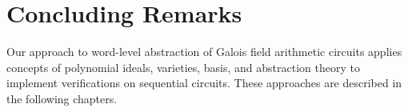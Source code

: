 \section{Concluding Remarks}
Our approach to word-level abstraction of Galois field arithmetic 
circuits applies concepts of polynomial ideals, varieties, \Grobner basis, 
and abstraction theory to implement verifications on sequential circuits. 
These approaches are described in the following chapters. 